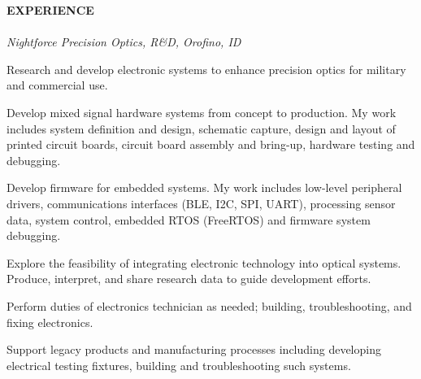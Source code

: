 \documentclass[10pt,letterpaper]{article}
\begin{document}
{\noindent\sc\bf EXPERIENCE}\vspace{.5pc}\\
\indent{}	\hspace*{\fill}{ March 2018, current employer} \\
\indent\indent 
{\sl Nightforce Precision Optics, R\&D, Orofino, ID}
				\vspace{0.1in}
                 \begin{itemize}[leftmargin=0.75in, rightmargin=0.25in, topsep=0mm,itemindent=0mm, label=\textrm{--}]
  {\small\sl
\item Research and develop electronic systems to enhance precision optics for military and commercial use. 
\item Develop mixed signal hardware systems from concept to production. My work includes system definition and design, schematic capture, design and layout of printed circuit boards, circuit board assembly and bring-up, hardware testing and debugging.
\item Develop firmware for embedded systems. My work includes low-level peripheral drivers, communications interfaces (BLE, I2C, SPI, UART), processing sensor data, system control, embedded RTOS (FreeRTOS) and firmware system debugging. 
\item Explore the feasibility of integrating electronic technology into optical systems. Produce, interpret, and share research data to guide development efforts. 
\item Perform duties of electronics technician as needed; building, troubleshooting, and fixing electronics.
\item Support legacy products and manufacturing processes including developing electrical testing fixtures, building and troubleshooting such systems. 
}
\end{itemize}

\vspace*{\fill}
\end{document}
